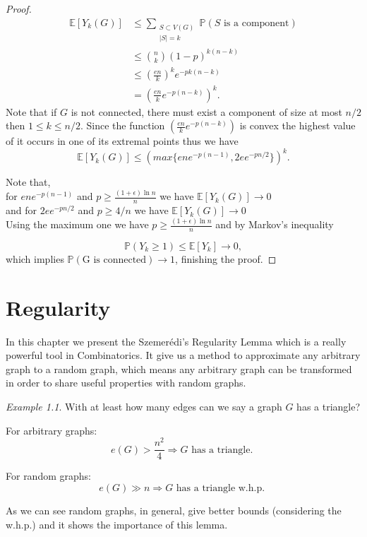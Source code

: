 \documentclass[12pt,twoside,a4paper]{book}
\numberwithin{equation}{section}
\let\log=\ln
\theoremstyle{remark}
\newtheorem{example}	[theorem] {Example}
\begin{document}
\begin{proof}
\begin{align*}
\mathbb{E}[Y_k (G)]  & \leq \sum_{\substack{S\subset V(G) \\ |S| = k}} \mathbb{P}(S\text{ is a component})\\
&\leq \binom{n}{k}(1-p)^{k(n-k)}\\
&\leq \left( \frac{en}{k} \right) ^k e^{-pk(n-k)}\\
& = \left( \frac{en}{k} e^{-p(n-k)} \right)^k.
\end{align*}
Note that if $G$ is not connected, there must exist a component of size at most $ n/2$ then $1 \leq k \leq n/2$. Since the function $\left( \frac{en}{k} e^{-p(n-k)} \right)$ is convex the highest value of it occurs in one of its extremal points thus we have
$$\mathbb{E}[Y_k (G)] \leq (max\{ene^{-p(n-1)}, 2ee^{-pn/2}\})^k .$$

Note that, \\
for $ene^{-p(n-1)}$ and $p \geq \frac{(1 + \epsilon) \log n}{n}$ we have $\mathbb{E}[Y_k (G)] \rightarrow 0$\\
and for $2ee^{-pn/2}$ and $p \geq 4/n$ we have $\mathbb{E}[Y_k (G)] \rightarrow 0$\\

Using the maximum one we have $p \geq \frac{(1 + \epsilon) \log n}{n}$  and by Markov's inequality

 $$\mathbb{P}(Y_k \geq 1) \leq \mathbb{E}[Y_k] \rightarrow 0,$$
 which implies $\mathbb{P}(\text{G is connected}) \rightarrow 1$, finishing the proof.

\end{proof}
\chapter{Regularity}
In this chapter we present the Szemerédi's Regularity Lemma which is a really powerful tool in Combinatorics. It give us a method to approximate any arbitrary graph to a random graph, which means any arbitrary graph can be transformed in order to share useful properties with random graphs.

\begin{example}
With at least how many edges can we say a graph $G$ has a triangle?

For arbitrary graphs:
$$ e(G) > \frac{n^2}{4} \Rightarrow G \text{ has a triangle. }$$

For random graphs:
$$ e(G) \gg n \Rightarrow G\text{ has a triangle w.h.p. } $$

As we can see random graphs, in general, give better bounds (considering the w.h.p.) and it shows the importance of this lemma.
\end{example}
\end{document}
